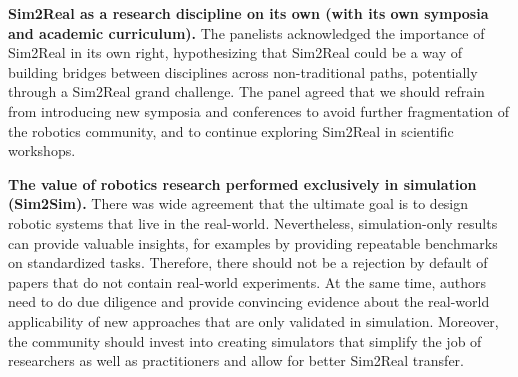 
{\bf Sim2Real as a research discipline on its own (with its own symposia and academic curriculum).}  
The panelists acknowledged the importance of Sim2Real in its own right, hypothesizing that Sim2Real could be a way of building bridges between disciplines across non-traditional paths, potentially through a Sim2Real grand challenge. The panel agreed that we should refrain from introducing new symposia and conferences to avoid further fragmentation of the robotics community, and to continue exploring Sim2Real in scientific workshops.

{\bf The value of robotics research performed exclusively in simulation (Sim2Sim).} There was wide agreement that the ultimate goal is to design robotic systems that live in the real-world. Nevertheless, simulation-only results can provide valuable insights, for examples by providing repeatable benchmarks on standardized tasks.
Therefore, there should not be a rejection by default of papers that do not contain real-world experiments. At the same time, authors need to do due diligence and provide convincing evidence about the real-world applicability of new approaches that are only validated in simulation. Moreover, the community should invest into creating simulators that simplify the job of researchers as well as practitioners and allow for better Sim2Real transfer. 